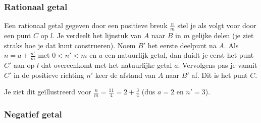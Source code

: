 
\subsubsection{Rationaal getal}

Een rationaal getal gegeven door een positieve breuk $\frac{n}{m}$ stel je als volgt voor door een punt $C$ op $l$.
Je verdeelt het lijnstuk van $A$ naar $B$ in $m$ gelijke delen (je ziet straks hoe je dat kunt construeren).
Noem $B'$ het eerste deelpunt na $A$.
Als $n=a+\frac{n'}{m}$ met $0<n'<m$ en $a$ een natuurlijk getal, dan duidt je eerst het punt $C'$ aan op $l$ dat overeenkomt met het natuurlijke getal $a$.
Vervolgens pas je vanuit $C'$ in de positieve richting $n'$ keer de afstand van $A$ naar $B'$ af.
Dit is het punt $C$.

Je ziet dit ge\"illustreerd voor $\frac{n}{m}=\frac{11}{4}=2+\frac{3}{4}$ (dus $a=2$ en $n'=3$).\vspace{5mm}


%

\subsubsection{Negatief getal}

%

